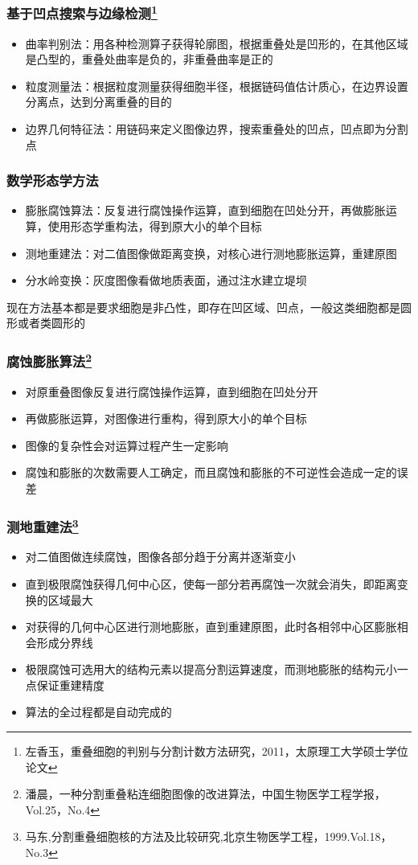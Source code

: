 \documentclass[notheorems,mathserif,table,compress]{beamer}  %
\begin{document}
\begin{frame}
  \frametitle{基于凹点搜索与边缘检测\footnote{左香玉，重叠细胞的判别与分割计数方法研究，2011，太原理工大学硕士学位论文}}
  \begin{itemize}
  \item 曲率判别法：用各种检测算子获得轮廓图，根据重叠处是凹形的，在其他区域是凸型的，重叠处曲率是负的，非重叠曲率是正的
  \item 粒度测量法：根据粒度测量获得细胞半径，根据链码值估计质心，在边界设置分离点，达到分离重叠的目的
  \item 边界几何特征法：用链码来定义图像边界，搜索重叠处的凹点，凹点即为分割点
  \end{itemize}
\end{frame}

\begin{frame}
  \frametitle{数学形态学方法}
  \begin{itemize}
  \item 膨胀腐蚀算法：反复进行腐蚀操作运算，直到细胞在凹处分开，再做膨胀运算，使用形态学重构法，得到原大小的单个目标
  \item 测地重建法：对二值图像做距离变换，对核心进行测地膨胀运算，重建原图
  \item 分水岭变换：灰度图像看做地质表面，通过注水建立堤坝\newline
  \end{itemize}
    \hspace{0.3in}现在方法基本都是要求细胞是非凸性，即存在凹区域、凹点，一般这类细胞都是圆形或者类圆形的
\end{frame}


\begin{frame}
  \frametitle{腐蚀膨胀算法\footnote{潘晨，一种分割重叠粘连细胞图像的改进算法，中国生物医学工程学报，Vol.25，No.4}}
  \begin{itemize}
  \item 对原重叠图像反复进行腐蚀操作运算，直到细胞在凹处分开
  \item 再做膨胀运算，对图像进行重构，得到原大小的单个目标
  \item 图像的复杂性会对运算过程产生一定影响
  \item 腐蚀和膨胀的次数需要人工确定，而且腐蚀和膨胀的不可逆性会造成一定的误差
  \end{itemize}
\end{frame}


\begin{frame}
  \frametitle{测地重建法\footnote{马东,分割重叠细胞核的方法及比较研究,北京生物医学工程，1999.Vol.18，No.3}}
  \begin{itemize}
  \item 对二值图做连续腐蚀，图像各部分趋于分离并逐渐变小
  \item 直到极限腐蚀获得几何中心区，使每一部分若再腐蚀一次就会消失，即距离变换的区域最大
  \item 对获得的几何中心区进行测地膨胀，直到重建原图，此时各相邻中心区膨胀相会形成分界线
  \item 极限腐蚀可选用大的结构元素以提高分割运算速度，而测地膨胀的结构元小一点保证重建精度
  \item 算法的全过程都是自动完成的
  \end{itemize}
\end{frame}
\end{document}
